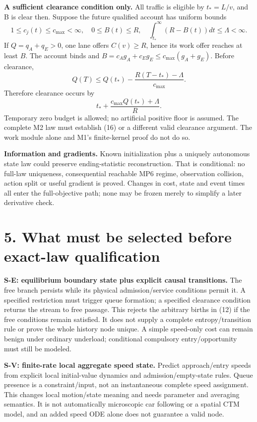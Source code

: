 \documentclass[11pt,a4paper]{article}
\begin{document}
\textbf{A sufficient clearance condition only.} All traffic is eligible
by $t_*=L/v$, and B is clear then. Suppose the future qualified account
has uniform bounds
\begin{equation}
 1\leq c_j(t)\leq c_{\max}<\infty,\quad 0\leq B(t)\leq R,
 \quad\int_{t_*}^\infty(R-B(t))dt\leq\Lambda<\infty. \tag{16}
\end{equation}
If $Q=q_A+q_E>0$, one lane offers $C(v)\geq R$, hence its work
offer reaches at least $B$. The account binds and
$B=c_Ag_A+c_Eg_E\leq c_{\max}(g_A+g_E)$. Before clearance,
\begin{equation}
 Q(T)\leq Q(t_*)-\frac{R(T-t_*)-\Lambda}{c_{\max}}. \tag{17}
\end{equation}
Therefore clearance occurs by
\begin{equation}
 t_*+\frac{c_{\max}Q(t_*)+\Lambda}{R}. \tag{18}
\end{equation}
Temporary zero budget is allowed; no artificial positive floor is assumed.
The complete M2 law must establish (16) or a different valid clearance
argument. The work module alone and M1's finite-kernel proof do not do so.

\textbf{Information and gradients.} Known initialization plus a uniquely
autonomous state law could preserve ending-statistic reconstruction.
That is conditional: no full-law uniqueness, consequential reachable MP6
regime, observation collision, action split or useful gradient is proved.
Changes in cost, state and event times all enter the full-objective path;
none may be frozen merely to simplify a later derivative check.

\newpage
\section*{5. What must be selected before exact-law qualification}

\textbf{S-E: equilibrium boundary state plus explicit causal transitions.}
The free branch persists while its physical admission/service conditions
permit it. A specified restriction must trigger queue formation; a specified
clearance condition returns the stream to free passage. This rejects the
arbitrary births in (12) if the free conditions remain satisfied. It does
not supply a complete entropy/transition rule or prove the whole history
node unique. A simple speed-only cost can remain benign under ordinary
underload; conditional compulsory entry/opportunity must still be modeled.

\textbf{S-V: finite-rate local aggregate speed state.}
Predict approach/entry speeds from explicit local initial-value dynamics
and admission/empty-state rules. Queue presence is a constraint/input,
not an instantaneous complete speed assignment. This changes local
motion/state meaning and needs parameter and averaging semantics. It is
not automatically microscopic car following or a spatial CTM model, and
an added speed ODE alone does not guarantee a valid node.
\end{document}
